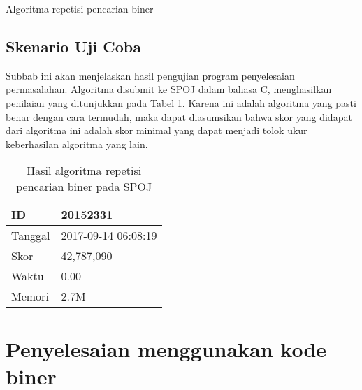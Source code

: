 \begin{algorithm}[h]
\caption{Algoritma repetisi pencarian biner}
\label{alg:repetisi_biner}
\end{algorithm}

\subsection{Skenario Uji Coba}

Subbab ini akan menjelaskan hasil pengujian program penyelesaian permasalahan. Algoritma disubmit ke SPOJ dalam bahasa C, menghasilkan penilaian yang ditunjukkan pada Tabel \ref{tab:score_repetitive}. Karena ini adalah algoritma yang pasti benar dengan cara termudah, maka dapat diasumsikan bahwa skor yang didapat dari algoritma ini adalah skor minimal yang dapat menjadi tolok ukur keberhasilan algoritma yang lain.

\begin{table}[h!]
\caption{Hasil algoritma repetisi pencarian biner pada SPOJ}
\label{tab:score_repetitive}
\begin{center}
\begin{tabular} {|l|l|}
\hline
ID & 20152331 \\ \hline
Tanggal & 2017-09-14 06:08:19 \\ \hline
Skor & 42,787,090 \\ \hline
Waktu & 0.00 \\ \hline
Memori & 2.7M \\ \hline
\end{tabular}
\end{center}
\end{table}

\section{Penyelesaian menggunakan kode biner}
